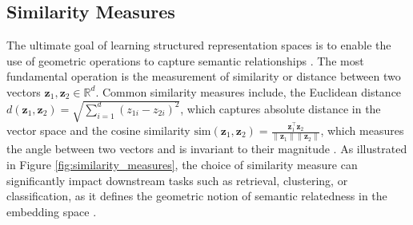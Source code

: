 

\subsection{Similarity Measures}

The ultimate goal of learning structured representation spaces is to enable the use of geometric operations to capture semantic relationships \cite{Mikolov2013}. The most fundamental operation is the measurement of similarity or distance between two vectors $\mathbf{z}_1, \mathbf{z}_2 \in \mathbb{R}^d$. Common similarity measures include, the Euclidean distance $d(\mathbf{z}_1, \mathbf{z}_2) = \sqrt{\sum_{i=1}^d (z_{1i} - z_{2i})^2}$, which captures absolute distance in the vector space and the cosine similarity $\mathrm{sim}(\mathbf{z}_1, \mathbf{z}_2) = \frac{\mathbf{z}_1^\top \mathbf{z}_2}{\|\mathbf{z}_1\| \|\mathbf{z}_2\|}$, which measures the angle between two vectors and is invariant to their magnitude \cite[p. 103 f., p. 112 f.]{Jurafsky2024_SLP}\cite[p. 48 f.]{Goldberg2017}. As illustrated in Figure \ref{fig:similarity_measures}, the choice of similarity measure can significantly impact downstream tasks such as retrieval, clustering, or classification, as it defines the geometric notion of semantic relatedness in the embedding space \cite{manning2008introduction,reimers2019sentence}.


